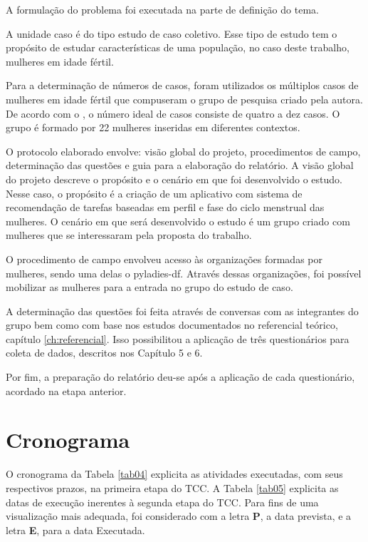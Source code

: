 A formulação do problema foi executada na parte de definição do tema.

A unidade caso é do tipo estudo de caso coletivo. Esse tipo de estudo tem o propósito de estudar características
de uma população, no caso deste trabalho, mulheres em idade fértil.

Para a determinação de números de casos, foram utilizados os múltiplos casos de mulheres em idade fértil que compuseram o grupo de pesquisa criado pela autora. De acordo com o , 
o número ideal de casos consiste de quatro a dez casos. O grupo é formado por 22 mulheres inseridas em diferentes contextos.

O protocolo elaborado envolve: visão global do projeto, procedimentos de campo, determinação das questões e guia para a elaboração do relatório.
A visão global do projeto descreve o propósito e o cenário em que foi desenvolvido o estudo. Nesse caso, o propósito é a criação de um aplicativo com sistema de recomendação de tarefas baseadas 
em perfil e fase do ciclo menstrual das mulheres. O cenário em que será desenvolvido o estudo é um grupo criado com mulheres que se interessaram pela proposta do trabalho.

O procedimento de campo envolveu acesso às organizações formadas por mulheres, sendo uma delas o pyladies-df. Através dessas organizações, foi possível mobilizar as mulheres 
para a entrada no grupo do estudo de caso.

A determinação das questões foi feita através de conversas com as 
integrantes do grupo bem como com base nos estudos documentados no 
referencial teórico, capítulo \ref{ch:referencial}. Isso possibilitou a aplicação de 
três questionários para coleta de dados, descritos nos Capítulo 5 e 6.

Por fim, a preparação do relatório deu-se após a aplicação de cada questionário, acordado na etapa anterior.

\section{Cronograma}

O cronograma da Tabela \ref{tab04} explicita as atividades executadas, 
com seus respectivos prazos, na primeira etapa do TCC. A Tabela \ref{tab05} explicita as datas 
de execução inerentes à segunda etapa do TCC. Para fins de uma visualização mais adequada, 
foi considerado com a letra \textbf{P}, a data prevista, e a letra \textbf{E},
para a data Executada.

